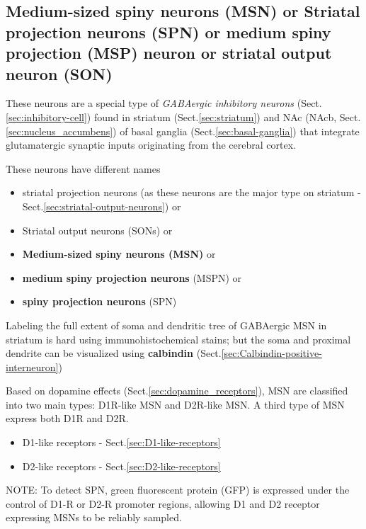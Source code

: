 \subsection{Medium-sized spiny neurons (MSN) or Striatal projection neurons
(SPN) or medium spiny projection (MSP) neuron or striatal output neuron (SON)}
\label{sec:medium_spiny_neurons}
\label{sec:striatal-projection-neurons}
\label{sec:striatal-output-neurons}


These neurons are a special type of {\it GABAergic inhibitory neurons}
(Sect.\ref{sec:inhibitory-cell}) found in striatum (Sect.\ref{sec:striatum}) and
NAc (NAcb, Sect.\ref{sec:nucleus_accumbens}) of basal ganglia
(Sect.\ref{sec:basal-ganglia}) that integrate glutamatergic synaptic inputs
originating from the cerebral cortex.

\begin{mdframed}
These neurons have different names
\begin{itemize}
  \item striatal projection neurons (as these neurons are the major type on
  striatum - Sect.\ref{sec:striatal-output-neurons}) or

  \item Striatal output neurons (SONs) or
  
  \item {\bf Medium-sized spiny neurons (MSN)} or 

  \item {\bf medium spiny projection neurons} (MSPN) or 
  
  \item {\bf spiny projection neurons} (SPN) 
  
\end{itemize}
\end{mdframed}

Labeling the full extent of soma and dendritic tree of GABAergic MSN in striatum
is hard using immunohistochemical stains; but the soma and proximal dendrite can
be visualized using {\bf calbindin} (Sect.\ref{sec:Calbindin-positive-interneuron})


Based on dopamine effects (Sect.\ref{sec:dopamine_receptors}), MSN are
classified into two main types: D1R-like MSN and D2R-like MSN.
A third type of MSN express both D1R and D2R.
\begin{itemize}
  \item D1-like receptors - Sect.\ref{sec:D1-like-receptors}
  \item D2-like receptors - Sect.\ref{sec:D2-like-receptors}
\end{itemize}
NOTE:  To detect SPN, green fluorescent protein (GFP) is expressed under the
control of D1-R or D2-R promoter regions, allowing D1 and D2 receptor expressing
MSNs to be reliably sampled.

